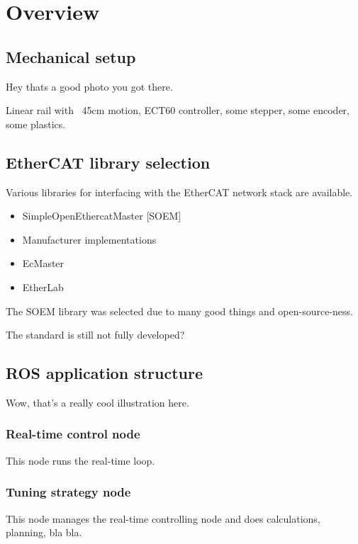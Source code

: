 \section{Overview}

\subsection{Mechanical setup}

Hey thats a good photo you got there.

Linear rail with ~45cm motion, ECT60 controller, some stepper, some encoder, some plastics.

\subsection{EtherCAT library selection}

Various libraries for interfacing with the EtherCAT network stack are available. 

\begin{itemize}
	\item SimpleOpenEthercatMaster [SOEM]
	\item Manufacturer implementations
	\item EcMaster
	\item EtherLab
\end{itemize}

The SOEM library was selected due to many good things and open-source-ness.

The standard is still not fully developed? 

\subsection{ROS application structure}

Wow, that's a really cool illustration here.

\subsubsection{Real-time control node}

This node runs the real-time loop.

\subsubsection{Tuning strategy node}

This node manages the real-time controlling node and does calculations, planning, bla bla.

